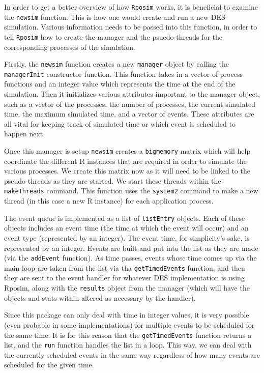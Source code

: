 \documentclass[a4paper, 11pt]{article} %
\begin{document}
In order to get a better overview of how \texttt{Rposim} works, it is beneficial to examine the \texttt{newsim} function. This is how one would create and run a new DES simulation. Various information needs to be passed into this function, in order to tell \texttt{Rposim} how to create the manager and the psuedo-threads for the corresponding processes of the simulation.

Firstly, the \texttt{newsim} function creates a new \texttt{manager} object by calling the \texttt{managerInit} constructor function. This function takes in a vector of process functions and an integer value which represents the time at the end of the simulation. Then it initializes various attributes important to the manager object, such as a vector of the processes, the number of processes, the current simulated time, the maximum simulated time, and a vector of events. These attributes are all vital for keeping track of simulated time or which event is scheduled to happen next.

Once this manager is setup \texttt{newsim} creates a \texttt{bigmemory} matrix which will help coordinate the different R instances that are required in order to simulate the various processes. We create this matrix now as it will need to be linked to the pseudo-threads as they are started. We start these threads within the \texttt{makeThreads} command. This function uses the \texttt{system2} command to make a new thread (in this case a new R instance) for each application process.

The event queue is implemented as a list of \texttt{listEntry} objects. Each of these objects includes an event time (the time at which the event will occur) and an event type (represented by an integer). The event time, for simplicity's sake, is represented by an integer. Events are built and put into the list as they are made (via the \texttt{addEvent} function). As time passes, events whose time comes up via the main loop are taken from the list via tha \texttt{getTimedEvents} function, and then they are sent to the event handler for whatever DES implementation is using Rposim, along with the \texttt{results} object from the manager (which will have the objects and stats within altered as necessary by the handler).

Since this package can only deal with time in integer values, it is very possible (even probable in some implementations) for multiple events to be scheduled for the same time. It is for this reason that the \texttt{getTimedEvents} function returns a list, and the \texttt{run} function handles the list in a loop. This way, we can deal with the currently scheduled events in the same way regardless of how many events are scheduled for the given time.
\end{document}
